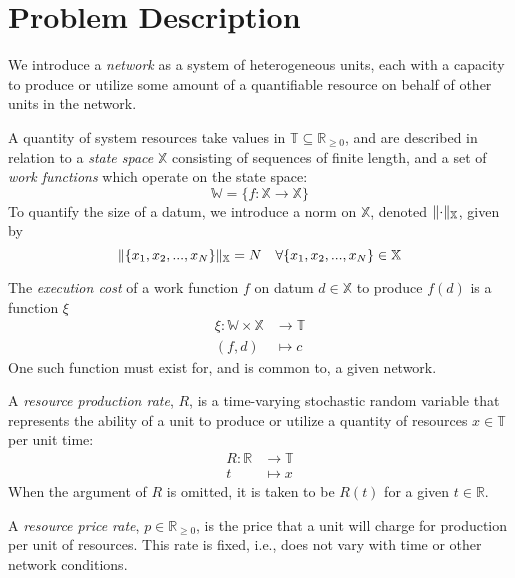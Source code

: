 \documentclass[../mthe-493-project-proposal.tex]{subfiles}
\begin{document}
    \chapter{Problem Description}
    \label{ch:problem-description}
    We introduce a \textit{network} as a system of heterogeneous units, each with a capacity to produce or utilize some amount of a quantifiable resource on behalf of other units in the network.

    A quantity of system resources take values in $\mathbb{T} \subseteq \mathbb{R}_{\geq 0}$, and are described in relation to a \textit{state space} $\mathbb{X}$ consisting of sequences of finite length, and a set of \textit{work functions} which operate on the state space:
    \begin{equation*}
        \mathbb{W} = \{f: \mathbb{X} \rightarrow \mathbb{X}\}
    \end{equation*}
    To quantify the size of a datum, we introduce a norm on $\mathbb{X}$, denoted $\lVert\cdot\rVert_{\mathbb{X}}$, given by
    \begin{equation*}
        \lVert\{x_1, x_2, ..., x_N\}\rVert_{\mathbb{X}} = N \quad \forall \{x_1, x_2, ..., x_N\} \in \mathbb{X}
    \end{equation*}

    The \textit{execution cost} of a work function $f$ on datum $d \in \mathbb{X}$ to produce $f(d)$ is a function $\xi$
    \begin{align*}
        \xi \colon \mathbb{W} \times \mathbb{X} &\to \mathbb{T} \\
        (f, d)                                  &\mapsto c
    \end{align*}
    One such function must exist for, and is common to, a given network.

    A \textit{resource production rate}, $R$, is a time-varying stochastic random variable that represents the ability of a unit to produce or utilize a quantity of resources $x \in \mathbb{T}$ per unit time:
    \begin{align*}
        R \colon \mathbb{R} &\to \mathbb{T} \\
        t                   &\mapsto x
    \end{align*}
    When the argument of $R$ is omitted, it is taken to be $R(t)$ for a given $t \in \mathbb{R}$.

    A \textit{resource price rate}, $p \in \mathbb{R}_{\geq 0}$, is the price that a unit will charge for production per unit of resources. This rate is fixed, i.e., does not vary with time or other network conditions.
\end{document}
